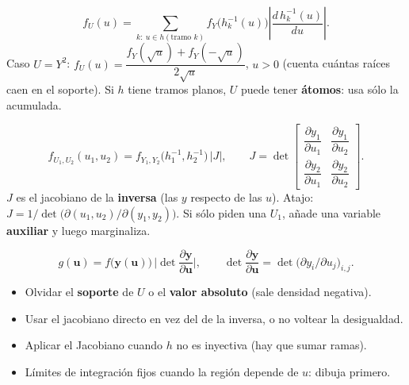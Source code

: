 \documentclass[10pt,a4paper]{article}
\begin{document}
\begin{thmbox}[frametitle={$h$ no monótona: suma sobre las ramas}]
\[
f_U(u)=\sum_{k:\ u\in h(\text{tramo }k)}
f_Y\big(h_k^{-1}(u)\big)\left|\frac{d\,h_k^{-1}(u)}{du}\right| .
\]
Caso $U=Y^2$:\quad
$f_U(u)=\dfrac{f_Y(\sqrt u)+f_Y(-\sqrt u)}{2\sqrt u}$, $u>0$ (cuenta cuántas
raíces caen en el soporte). Si $h$ tiene tramos planos, $U$ puede tener
\textbf{átomos}: usa sólo la acumulada.
\end{thmbox}

\begin{thmbox}[frametitle={Jacobiano bivariado}]
\[
f_{U_1,U_2}(u_1,u_2)=f_{Y_1,Y_2}\big(h_1^{-1},h_2^{-1}\big)\,|J|,\qquad
J=\det\begin{bmatrix}
\dfrac{\partial y_1}{\partial u_1} & \dfrac{\partial y_1}{\partial u_2}\\[8pt]
\dfrac{\partial y_2}{\partial u_1} & \dfrac{\partial y_2}{\partial u_2}
\end{bmatrix}.
\]
$J$ es el jacobiano de la \textbf{inversa} (las $y$ respecto de las $u$). Atajo:
$J=1\big/\det\big(\partial(u_1,u_2)/\partial(y_1,y_2)\big)$. Si sólo piden una
$U_1$, añade una variable \textbf{auxiliar} y luego marginaliza.
\end{thmbox}

\begin{thmbox}[frametitle={Caso $n$-dimensional}]
\[
g(\mathbf u)=f\big(\mathbf y(\mathbf u)\big)\,\Big|\det\frac{\partial \mathbf y}{\partial \mathbf u}\Big|,\qquad
\det\frac{\partial \mathbf y}{\partial \mathbf u}
=\det\!\Big(\partial y_i/\partial u_j\Big)_{i,j}.
\]
\end{thmbox}

\begin{warnbox}[frametitle={Errores que hay que evitar}]
\begin{itemize}
  \item Olvidar el \textbf{soporte} de $U$ o el \textbf{valor absoluto} (sale
        densidad negativa).
  \item Usar el jacobiano directo en vez del de la inversa, o no voltear la
        desigualdad.
  \item Aplicar el Jacobiano cuando $h$ no es inyectiva (hay que sumar ramas).
  \item Límites de integración fijos cuando la región depende de $u$: dibuja
        primero.
\end{itemize}
\end{warnbox}

\end{document}
